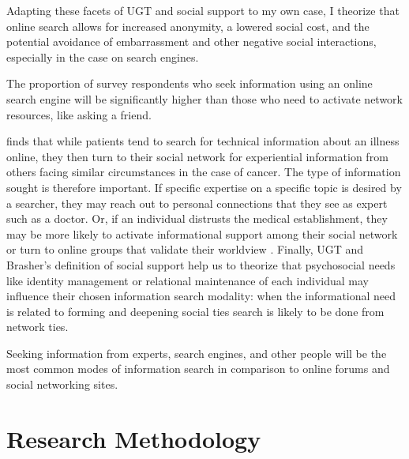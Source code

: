 Adapting these facets of UGT and social support to my own case, I theorize that
online search allows for increased anonymity, a lowered social cost, and the
potential avoidance of embarrassment and other negative social interactions,
especially in the case on search engines.

\begin{hyp} \label{hyp:online-vs-network}
The proportion of survey respondents who seek information
using an online search engine will be significantly higher than those who
need to activate network resources, like asking a friend.
\end{hyp}


\citet{rainsCopingIllnessDigitally2018} finds that while patients tend to search for
technical information about an illness online, they then turn to their social
network for experiential information from others facing similar circumstances in
the case of cancer. The type of information sought is therefore important. If
specific expertise on a specific topic is desired by a searcher, they may reach
out to personal connections that they see as expert such as a doctor. Or, if an
individual distrusts the medical establishment, they may be more likely to
activate informational support among their social network or turn to online
groups that validate their worldview \citep{bogersHowSocialAre2014}. Finally,
UGT and Brasher's definition of social support
\citeyearpar{brashersInformationSeekingAvoiding2002} help us to theorize that
psychosocial needs like identity management or relational maintenance of each
individual may influence their chosen information search modality: when the
informational need is related to forming and deepening social ties search is
likely to be done from network ties.

\begin{hyp} \label{hyp:drgooglefriend}
Seeking information from experts, search engines, and other people
will be the most common modes of information search in comparison
to online forums and social networking sites. 
\end{hyp}

\hypertarget{research-methodology}{\section{Research Methodology}\label{research-methodology}}


